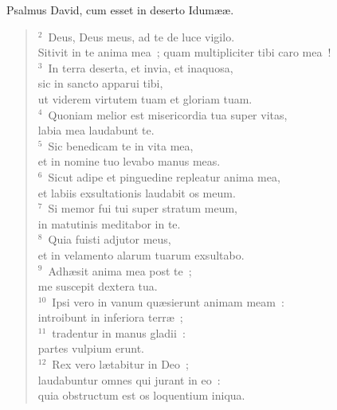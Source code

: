 \lettrine[lines=3,image=true,loversize=0.05,lraise=-0.03]{P}{}salmus David, cum esset in deserto Idum\ae \ae .
\begin{flushleft}\begin{verse}\vspace{6pt}${}^{2}$~Deus, Deus meus, ad te de luce vigilo.\\ Sitivit in te anima mea~; quam multipliciter tibi caro mea~!\\
${}^{3}$~In terra deserta, et invia, et inaquosa,\\ sic in sancto apparui tibi,\\ ut viderem virtutem tuam et gloriam tuam.\\
${}^{4}$~Quoniam melior est misericordia tua super vitas,\\ labia mea laudabunt te.\\
${}^{5}$~Sic benedicam te in vita mea,\\ et in nomine tuo levabo manus meas.\\
${}^{6}$~Sicut adipe et pinguedine repleatur anima mea,\\ et labiis exsultationis laudabit os meum.\\
${}^{7}$~Si memor fui tui super stratum meum,\\ in matutinis meditabor in te.\\
${}^{8}$~Quia fuisti adjutor meus,\\ et in velamento alarum tuarum exsultabo.\\
${}^{9}$~Adh\ae sit anima mea post te~;\\ me suscepit dextera tua.\\
${}^{10}$~Ipsi vero in vanum qu\ae sierunt animam meam~:\\ introibunt in inferiora terr\ae~;\\
${}^{11}$~tradentur in manus gladii~:\\ partes vulpium erunt.\\
${}^{12}$~Rex vero l\ae tabitur in Deo~;\\ laudabuntur omnes qui jurant in eo~:\\ quia obstructum est os loquentium iniqua.\end{verse}\end{flushleft}



